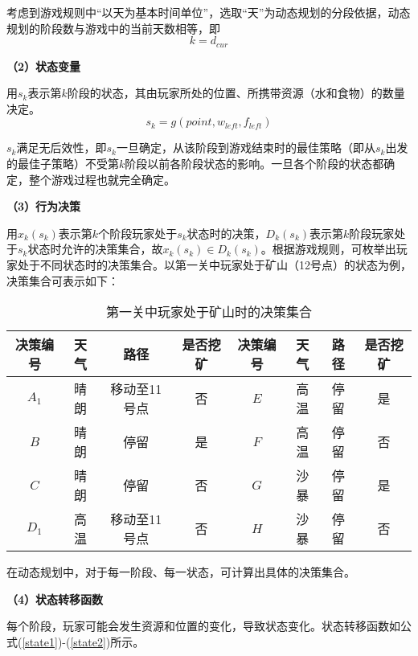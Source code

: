 \documentclass[bwprint]{cumcmthesis} %
\begin{document}
考虑到游戏规则中“以天为基本时间单位”，选取“天”为动态规划的分段依据，动态规划的阶段数与游戏中的当前天数相等，即
\begin{equation}
    k=d_{cur}
\end{equation}

\textbf{（2）状态变量} 

用$s_k$表示第$k$阶段的状态，其由玩家所处的位置、所携带资源（水和食物）的数量决定。
\begin{equation}
    s_k=g(point,w_{left},f_{left})
\end{equation}

$s_k$满足无后效性，即$s_k$一旦确定，从该阶段到游戏结束时的最佳策略（即从$s_k$出发的最佳子策略）不受第$k$阶段以前各阶段状态的影响。一旦各个阶段的状态都确定，整个游戏过程也就完全确定。

\textbf{（3）行为决策} 

用$x_k(s_k)$表示第$k$个阶段玩家处于$s_k$状态时的决策，$D_k(s_k)$表示第$k$阶段玩家处于$s_k$状态时允许的决策集合，故$x_k(s_k) \in D_k(s_k)$。根据游戏规则，可枚举出玩家处于不同状态时的决策集合。以第一关中玩家处于矿山（12号点）的状态为例，决策集合可表示如下：

\begin{table}[!htbp]
    \caption{第一关中玩家处于矿山时的决策集合}\label{tab:decisions} \centering
    \begin{tabular}{cccc|cccc}
        \toprule[1.5pt]
        决策编号 & 天气 & 路径 & 是否挖矿 & 决策编号 & 天气 & 路径 & 是否挖矿\\
        \midrule[1pt]
        $A_1$ & 晴朗 & 移动至11号点 & 否 & $E$ & 高温 & 停留 & 是\\
        $B$ & 晴朗 & 停留 & 是 & $F$ & 高温 & 停留 & 否\\
        $C$ & 晴朗 & 停留 & 否 & $G$ & 沙暴 & 停留 & 是\\
        $D_1$ & 高温 & 移动至11号点 & 否 & $H$ & 沙暴 & 停留 & 否 \\
        \bottomrule[1.5pt]
    \end{tabular}
\end{table}

在动态规划中，对于每一阶段、每一状态，可计算出具体的决策集合。

\textbf{（4）状态转移函数} 

每个阶段，玩家可能会发生资源和位置的变化，导致状态变化。状态转移函数如公式(\ref{state1})-(\ref{state2})所示。
\end{document}
